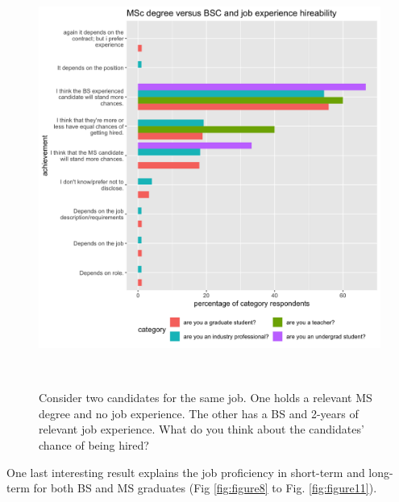 \documentclass{sigchi}
\begin{document}
\begin{figure}
 \includegraphics[scale=0.2]{../data-analysis/plots_output/MSc_degree_versus_BSC_and_job_experience_hireability.png}
  \caption{Consider two candidates for the same job. One holds a relevant MS degree and no job experience. The other has a BS and 2-years of relevant job experience. What do you think about the candidates' chance of being hired?}~\label{fig:figure7}
\end{figure}

One last interesting result explains the job proficiency in short-term and long-term for both BS and MS graduates (Fig \ref{fig:figure8} to Fig. \ref{fig:figure11}).
\end{document}
